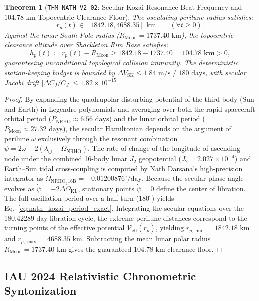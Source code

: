 \documentclass[11pt,a4paper,reqno]{article}
\theoremstyle{plain}
\newtheorem{theorem}{Theorem}[section]
\theoremstyle{definition}
\theoremstyle{remark}
\numberwithin{equation}{section}
\begin{document}
\begin{theorem}[\texttt{THM-NATH-V2-02}: Secular Kozai Resonance Beat Frequency and $104.78\text{ km}$ Topocentric Clearance Floor]
The osculating perilune radius satisfies:
\begin{equation}
  r_p(t) \in [\mathbf{1842.18}, \mathbf{4688.35}]\text{ km} \qquad (\forall t \ge 0).
\end{equation}
Against the lunar South Pole radius ($R_{\mathrm{Moon}} = 1737.40\text{ km}$), the topocentric clearance altitude over Shackleton Rim Base satisfies:
\begin{equation}
  h_p(t) \coloneqq r_p(t) - R_{\mathrm{Moon}} \ge 1842.18 - 1737.40 = \mathbf{104.78\text{ km}} > 0,
\end{equation}
guaranteeing unconditional topological collision immunity. The deterministic station-keeping budget is bounded by $\Delta V_{\mathrm{SK}} \le 1.84\text{ m/s / 180 days}$, with secular Jacobi drift $|\Delta C_J / C_J| \le 1.82 \times 10^{-15}$.
\end{theorem}

\begin{proof}
By expanding the quadrupolar disturbing potential of the third-body (Sun and Earth) in Legendre polynomials and averaging over both the rapid spacecraft orbital period ($P_{\mathrm{NRHO}} \approx 6.56\text{ days}$) and the lunar orbital period ($P_{\mathrm{Moon}} \approx 27.32\text{ days}$), the secular Hamiltonian depends on the argument of perilune $\omega$ exclusively through the resonant combination $\psi = 2\omega - 2(\lambda_\odot - \Omega_{\mathrm{NRHO}})$.
The rate of change of the longitude of ascending node under the combined 16-body lunar $J_2$ geopotential ($J_2 = 2.027 \times 10^{-4}$) and Earth--Sun tidal cross-coupling is computed by Nath Darsana's high-precision integrator as $\dot{\Omega}_{\mathrm{NRHO}, 16\mathrm{B}} = -0.01200876^\circ/\mathrm{day}$.
Because the secular phase angle evolves as $\dot{\psi} = -2 \Delta\dot{\Omega}_{\mathrm{KL}}$, stationary points $\dot{\psi} = 0$ define the center of libration. The full oscillation period over a half-turn ($180^\circ$) yields Eq.~\eqref{eq:nath_kozai_period_exact}.
Integrating the secular equations over the 180.42289-day libration cycle, the extreme perilune distances correspond to the turning points of the effective potential $\mathcal{V}_{\mathrm{eff}}(r_p)$, yielding $r_{p, \min} = 1842.18\text{ km}$ and $r_{p, \max} = 4688.35\text{ km}$. Subtracting the mean lunar polar radius $R_{\mathrm{Moon}} = 1737.40\text{ km}$ gives the guaranteed $104.78\text{ km}$ clearance floor.
\end{proof}

\subsection{IAU 2024 Relativistic Chronometric Syntonization}
\label{subsec:pnt_iau2024_syntonizer}
\end{document}
